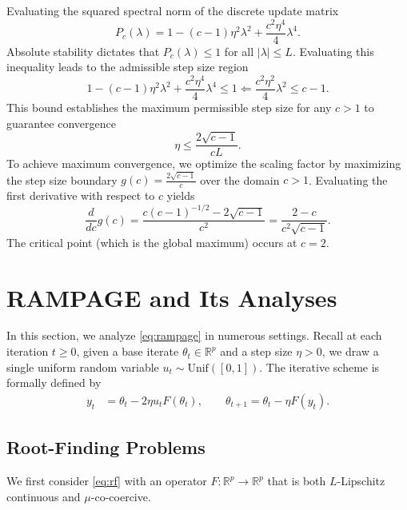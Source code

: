 \documentclass[letter,11pt]{article}
\begin{document}
Evaluating the squared spectral norm of the discrete update matrix
\begin{equation}
P_c(\lambda) = 1 - (c - 1)\eta^2 \lambda^2 + \frac{c^2\eta^4}{4} \lambda^4.
\end{equation}
Absolute stability dictates that $P_c(\lambda) \le 1$ for all $|\lambda| \le L$. Evaluating this inequality leads to the admissible step size region
\begin{equation}
1 - (c - 1)\eta^2 \lambda^2 + \frac{c^2\eta^4}{4} \lambda^4 \le 1 \Longleftarrow \frac{c^2\eta^2}{4} \lambda^2 \le c - 1.
\end{equation}
This bound establishes the maximum permissible step size for any $c > 1$ to guarantee convergence
\begin{equation} \label{eq:scale_step_bound}
\eta \le \frac{2\sqrt{c - 1}}{c L}.
\end{equation}
To achieve maximum convergence, we optimize the scaling factor by maximizing the step size boundary $g(c) = \frac{2\sqrt{c - 1}}{c}$ over the domain $c > 1$. Evaluating the first derivative with respect to $c$ yields
\begin{equation}
\frac{d}{dc} g(c) = \frac{c(c-1)^{-1/2} - 2\sqrt{c-1}}{c^2} = \frac{2 - c}{c^2\sqrt{c-1}}.
\end{equation}
The critical point (which is the global maximum) occurs at $c = 2$.
\section{RAMPAGE and Its Analyses}\label{sec:rampage}
In this section, we analyze \eqref{eq:rampage} in numerous settings. Recall at each iteration $t \ge 0$, given a base iterate $\theta_t \in \mathbb{R}^p$ and a step size $\eta > 0$, we draw a single uniform random variable $u_t \sim \mathrm{Unif}([0, 1])$. The iterative scheme is formally defined by
\begin{equation} %
\begin{aligned}
y_t &= \theta_t - 2\eta u_t F(\theta_t), \qquad
\theta_{t+1} = \theta_t - \eta F(y_t).
\end{aligned}
\end{equation}
\subsection{Root-Finding Problems}
We first consider \eqref{eq:rf} with an operator $F: \mathbb{R}^p \to \mathbb{R}^p$ that is both $L$-Lipschitz continuous and $\mu$-co-coercive. 
\end{document}
